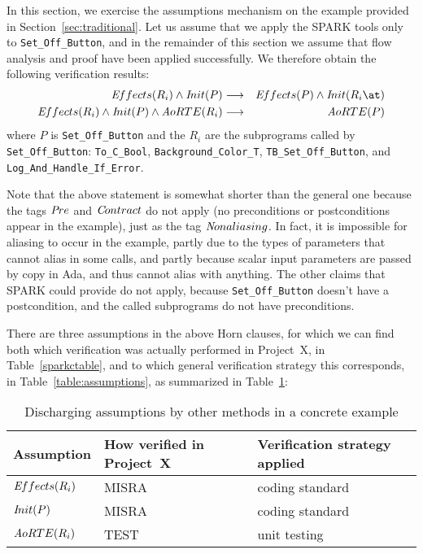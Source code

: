 \documentclass{llncs}
\newcommand{\spark}{SPARK\xspace}
\newcommand{\projectx}{Project~X\xspace}
\begin{document}
In this section, we exercise the assumptions mechanism on the example provided
in Section~\ref{sec:traditional}. Let us assume that we apply the \spark tools
only to \texttt{Set\_Off\_Button}, and in the remainder of this section we
assume that flow analysis and proof have been applied successfully. We
therefore obtain the following verification results:
\begin{eqnarray*}
   {\textit Effects}(R_i) \wedge {\textit Init}(P)
    & \longrightarrow &{\textit Effects}(P) \wedge {\textit Init}(R_i\at)\\
   {\textit Effects}(R_i) \wedge {\textit Init}(P) \wedge
   {\textit AoRTE}(R_i)
   & \longrightarrow &
   {\textit AoRTE}(P)
\end{eqnarray*}
where $P$ is \texttt{Set\_Off\_Button} and the $R_i$ are
the subprograms called by \texttt{Set\_Off\_Button}:
 \texttt{To\_C\_Bool},
 \texttt{Background\_Color\_T},
 \texttt{TB\_Set\_Off\_Button}, and
 \texttt{Log\_And\_Handle\_If\_Error}.

Note that the above statement is somewhat shorter than the general one because
the tags ${\textit Pre}$ and ${\textit Contract}$ do not apply (no
preconditions or postconditions appear in the example), just as the tag
${\textit Nonaliasing}$. In fact, it is impossible for aliasing to occur in
the example, partly due to the types of parameters that cannot alias in some
calls, and partly because scalar input parameters are passed by copy in Ada,
and thus cannot alias with anything.  The other claims that \spark could
provide do not apply, because \texttt{Set\_Off\_Button} doesn't have a
postcondition, and the called subprograms do not have preconditions.

There are three assumptions in the above Horn clauses, for which we can find
both which verification was actually performed in \projectx, in
Table~\ref{sparkctable}, and to which general verification strategy this
corresponds, in Table~\ref{table:assumptions}, as summarized in
Table~\ref{table:concrete-example}:

\begin{table}[h]
\begin{center}
\begin{tabular}{l|l|l}
Assumption & How verified in \projectx & Verification strategy applied\\
\hline
${\textit Effects}(R_i)$ & MISRA  & coding standard\\
${\textit Init}(P)$      & MISRA & coding standard\\
${\textit AoRTE}(R_i)$   & TEST  & unit testing\\
\end{tabular}
\end{center}
\caption{Discharging assumptions by other methods in a concrete example}
\label{table:concrete-example}
\end{table}
\end{document}
